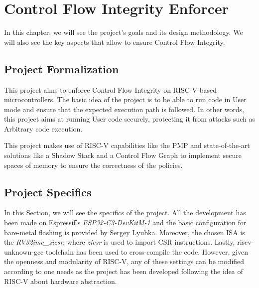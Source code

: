 \chapter{Control Flow Integrity Enforcer}
\label{cha:project}

In this chapter, we will see the project's goals and its design methodology. We
will also see the key aspects that allow to ensure Control Flow Integrity.

\section{Project Formalization}
\label{sec:project_formalization}

This project aims to enforce Control Flow Integrity on RISC-V-based microcontrollers.
The basic idea of the project is to be able to run code in User mode and ensure
that the expected execution path is followed. In other words, this project aims
at running User code securely, protecting it from attacks such as Arbitrary code
execution.

This project makes use of RISC-V capabilities like the PMP and state-of-the-art solutions
like a Shadow Stack and a Control Flow Graph to implement secure spaces of memory
to ensure the correctness of the policies.

\section{Project Specifics}
\label{sec:project_specifics}

In this Section, we will see the specifics of the project. All the development
has been made on Espressif's \textit{ESP32-C3-DevKitM-1} \cite{esp32c3} and the basic
configuration for bare-metal flashing is provided by Sergey Lyubka\cite{mdk}. Moreover,
the chosen ISA is the \textit{RV32imc\_zicsr}, where \textit{zicsr} is used to import
CSR instructions. Lastly, {riscv-unknown-gcc} toolchain has been used to cross-compile
the code. However, given the openness and modularity of RISC-V, any of these
settings can be modified according to one needs as the project has been
developed following the idea of RISC-V about hardware abstraction.

